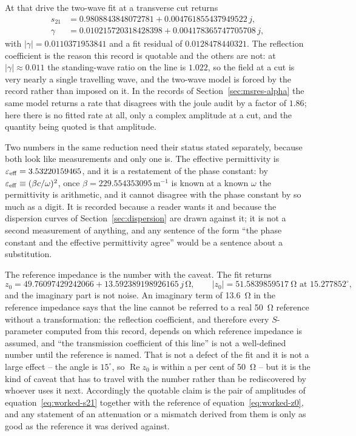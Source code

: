 At that drive the two-wave fit at a transverse cut returns
\begin{equation}
  \begin{aligned}
    s_{21} &= 0.9808843848072781 + 0.004761855437949522\,j , \\
    \gamma &= 0.010215720318428398 + 0.004178365747705708\,j ,
  \end{aligned}
  \label{eq:worked-s21}
\end{equation}
with $|\gamma| = 0.0110371953841$ and a fit residual of $0.0128478440321$. The reflection coefficient is the
reason this record is quotable and the others are not: at $|\gamma| \approx 0.011$ the standing-wave ratio on
the line is $1.022$, so the field at a cut is very nearly a single travelling wave, and the two-wave model is
forced by the record rather than imposed on it. In the records of Section~\ref{sec:msres-alpha} the same model
returns a rate that disagrees with the joule audit by a factor of $1.86$; here there is no fitted rate at all,
only a complex amplitude at a cut, and the quantity being quoted is that amplitude.

Two numbers in the same reduction need their status stated separately, because both look like measurements and
only one is. The effective permittivity is $\varepsilon_{\mathrm{eff}} = 3.53220159465$, and it is a restatement of the
phase constant: by $\varepsilon_{\mathrm{eff}} \equiv (\beta c/\omega)^2$, once $\beta = 229.554353095$\,m$^{-1}$ is
known at a known $\omega$ the permittivity is arithmetic, and it cannot disagree with the phase constant by so
much as a digit. It is recorded because a reader wants it and because the dispersion curves of
Section~\ref{sec:dispersion} are drawn against it; it is not a second measurement of anything, and any sentence
of the form ``the phase constant and the effective permittivity agree'' would be a sentence about a
substitution.

The reference impedance is the number with the caveat. The fit returns
\begin{equation}
  z_0 = 49.76097429242066 + 13.592389198926165\,j \,\si{\ohm} ,
  \qquad |z_0| = \SI{51.5839859517}{\ohm} \text{ at } 15.277852^{\circ} ,
  \label{eq:worked-z0}
\end{equation}
and the imaginary part is not noise. An imaginary term of \SI{13.6}{\ohm} in the reference impedance says that
the line cannot be referred to a real \SI{50}{\ohm} reference without a transformation: the reflection
coefficient, and therefore every $S$-parameter computed from this record, depends on which reference impedance
is assumed, and ``the transmission coefficient of this line'' is not a well-defined number until the reference is
named. That is not a defect of the fit and it is not a large effect -- the angle is $15^{\circ}$, so
$\operatorname{Re} z_0$ is within a per cent of \SI{50}{\ohm} -- but it is the kind of caveat that has to travel
with the number rather than be rediscovered by whoever uses it next. Accordingly the quotable claim is the pair
of amplitudes of equation~\eqref{eq:worked-s21} together with the reference of
equation~\eqref{eq:worked-z0}, and any statement of an attenuation or a mismatch derived from them is only as
good as the reference it was derived against.

